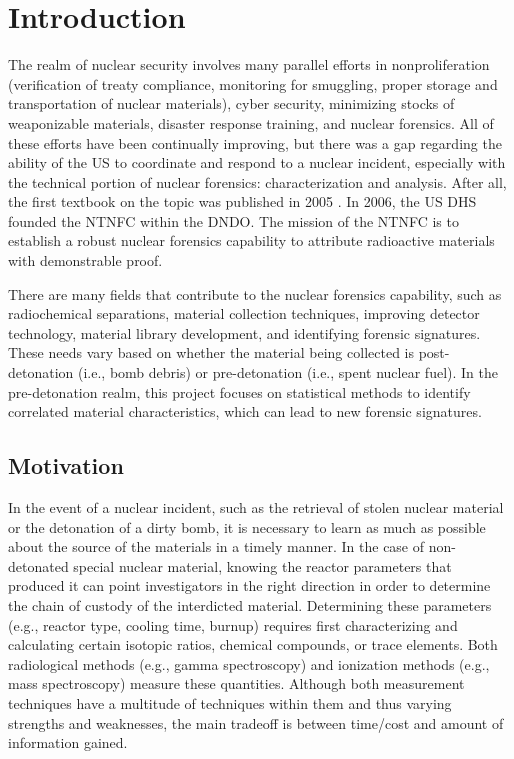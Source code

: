 \chapter{Introduction}
\label{ch:intro}

The realm of nuclear security involves many parallel efforts in
nonproliferation (verification of treaty compliance, monitoring for smuggling,
proper storage and transportation of nuclear materials), cyber security,
minimizing stocks of weaponizable materials, disaster response training, and
nuclear forensics. All of these efforts have been continually improving, but
there was a gap regarding the ability of the \gls{US} to coordinate and respond
to a nuclear incident, especially with the technical portion of nuclear
forensics: characterization and analysis. After all, the first textbook on the
topic was published in 2005 . In 2006, the \gls{US} \gls{DHS}
founded the \gls{NTNFC} within the \gls{DNDO}. The mission of the \gls{NTNFC}
is to establish a robust nuclear forensics capability to attribute radioactive
materials with demonstrable proof.

There are many fields that contribute to the nuclear forensics capability, such
as radiochemical separations, material collection techniques, improving
detector technology, material library development, and identifying forensic
signatures. These needs vary based on whether the material being collected is
post-detonation (i.e., bomb debris) or pre-detonation (i.e., spent nuclear
fuel). In the pre-detonation realm, this project focuses on statistical methods
to identify correlated material characteristics, which can lead to new forensic
signatures. 


\section{Motivation}
\label{sec:motivation}

In the event of a nuclear incident, such as the retrieval of stolen nuclear
material or the detonation of a dirty bomb, it is necessary to learn as much as
possible about the source of the materials in a timely manner. In the case of
non-detonated special nuclear material, knowing the reactor parameters that
produced it can point investigators in the right direction in order to
determine the chain of custody of the interdicted material. Determining these
parameters (e.g., reactor type, cooling time, burnup) requires first
characterizing and calculating certain isotopic ratios, chemical compounds, or
trace elements.  Both radiological methods (e.g., gamma spectroscopy) and
ionization methods (e.g., mass spectroscopy) measure these quantities. Although
both measurement techniques have a multitude of techniques within them and thus
varying strengths and weaknesses, the main tradeoff is between time/cost and
amount of information gained. 

